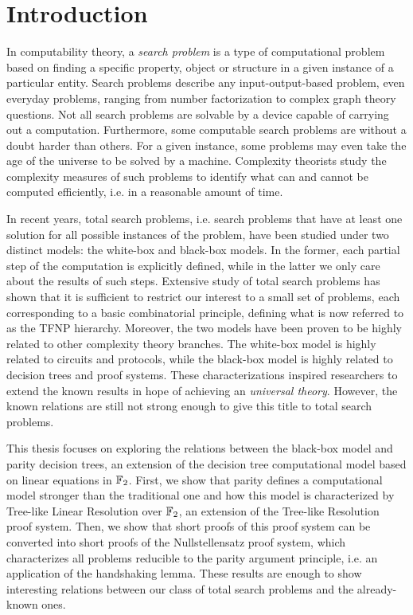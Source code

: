 
\chapter*{Introduction} 

In computability theory, a \textit{search problem} is a type of computational problem based on finding a specific property, object or structure in a given instance of a particular entity. Search problems describe any input-output-based problem, even everyday problems, ranging from number factorization to complex graph theory questions. Not all search problems are solvable by a device capable of carrying out a computation. Furthermore, some computable search problems are without a doubt harder than others. For a given instance, some problems may even take the age of the universe to be solved by a machine. Complexity theorists study the complexity measures of such problems to identify what can and cannot be computed efficiently, i.e. in a reasonable amount of time.

In recent years, total search problems, i.e. search problems that have at least one solution for all possible instances of the problem, have been studied under two distinct models: the white-box and black-box models. In the former, each partial step of the computation is explicitly defined, while in the latter we only care about the results of such steps. Extensive study of total search problems has shown that it is sufficient to restrict our interest to a small set of problems, each corresponding to a basic combinatorial principle, defining what is now referred to as the \textsf{TFNP} hierarchy. 
Moreover, the two models have been proven to be highly related to other complexity theory branches. The white-box model is highly related to circuits and protocols, while the black-box model is highly related to decision trees and proof systems. These characterizations inspired researchers to extend the known results in hope of achieving an \textit{universal theory}. However, the known relations are still not strong enough to give this title to total search problems.

This thesis focuses on exploring the relations between the black-box model and parity decision trees, an extension of the decision tree computational model based on linear equations in $\mathbb{F}_2$. First, we show that parity defines a computational model stronger than the traditional one and how this model is characterized by Tree-like Linear Resolution over $\mathbb{F}_2$, an extension of the Tree-like Resolution proof system. Then, we show that short proofs of this proof system can be converted into short proofs of the Nullstellensatz proof system, which characterizes all problems reducible to the parity argument principle, i.e. an application of the handshaking lemma. These results are enough to show interesting relations between our class of total search problems and the already-known ones.



\cleardoublepage